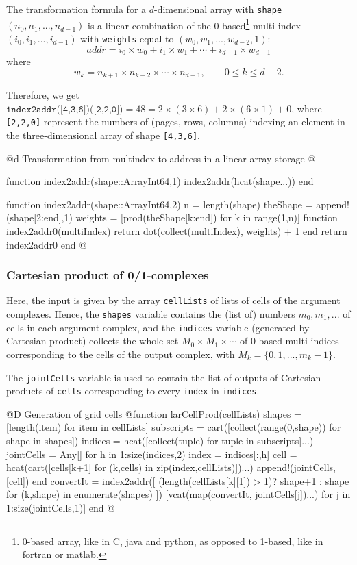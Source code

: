 The transformation formula for a $d$-dimensional array with \texttt{shape} $(n_0,n_1,...,n_{d-1})$ is a linear combination of the 0-based\footnote{0-based array, like in C, java and python, as opposed to 1-based, like in fortran or matlab.} multi-index $(i_0,i_1,...,i_{d-1})$ with \texttt{weights} equal to $(w_0,w_1,...,w_{d-2},1)$:
\[
addr = i_0\times w_0 +i_1\times w_1 +\cdots +i_{d-1}\times w_{d-1}
\]
where 
\[
w_k = n_{k+1} \times n_{k+2} \times\cdots\times  n_{d-1}, \qquad 0\leq k\leq d-2.
\]

Therefore, we get $\texttt{index2addr([4,3,6])([2,2,0])}=48= 2\times(3\times 6)+2\times(6\times 1)+0$,
where \texttt{[2,2,0]} represent the numbers of (pages, rows, columns) indexing an element in the three-dimensional array of shape \texttt{[4,3,6]}.

@d Transformation from multindex to address in a linear array storage
@{function index2addr(shape::Array{Int64,1})
	index2addr(hcat(shape...))
end

function index2addr(shape::Array{Int64,2})
    n = length(shape)
    theShape = append!(shape[2:end],1)
    weights = [prod(theShape[k:end]) for k in range(1,n)]
    function index2addr0(multiIndex)
        return dot(collect(multiIndex), weights) + 1
    end
    return index2addr0
end
@}


\subsubsection{Cartesian product of 0/1-complexes}
Here, the input is given by the array \texttt{cellLists} of lists of cells of the argument complexes. Hence, the \texttt{shapes} variable contains the (list of) numbers $m_0, m_1, ...$ of cells in each argument complex, and the \texttt{indices} variable (generated by Cartesian product) collects the whole set $M_0 \times M_1 \times \cdots$ of 0-based multi-indices corresponding to the cells of the output complex, with $M_k = \{0,1,...,m_{k}-1\}$.

The \texttt{jointCells} variable is used to contain the list of outputs of Cartesian products of \texttt{cells} corresponding to every \texttt{index} in \texttt{indices}.

@D Generation of grid cells 
@{function larCellProd(cellLists)
	shapes = [length(item) for item in cellLists]
	subscripts = cart([collect(range(0,shape)) for shape in shapes])
	indices = hcat([collect(tuple) for tuple in subscripts]...)
	jointCells = Any[]
	for h in 1:size(indices,2)
		index = indices[:,h]
		cell = hcat(cart([cells[k+1] for (k,cells) in zip(index,cellLists)])...)
		append!(jointCells,[cell])
	end
	convertIt = index2addr([ (length(cellLists[k][1]) > 1)? shape+1 : shape 
		for (k,shape) in enumerate(shapes) ])		
	[vcat(map(convertIt, jointCells[j])...) for j in 1:size(jointCells,1)]
end
@}



